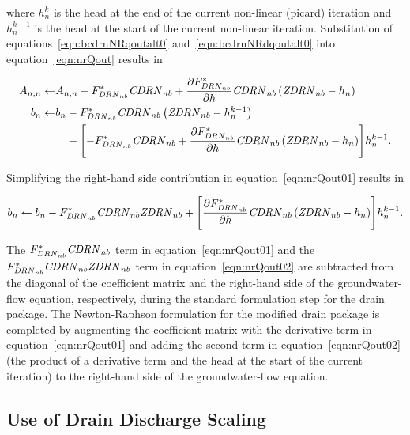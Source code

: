 \noindent where $h^k_n$ is the head at the end of the current non-linear (picard) iteration and $h^{k-1}_n$ is the head at the start of the current non-linear iteration. Substitution of equations~\ref{eqn:bcdrnNRqoutalt0} and~\ref{eqn:bcdrnNRdqoutalt0} into equation~\ref{eqn:nrQout} results in

\begin{equation}
	\label{eqn:nrQout01}
	\begin{aligned}
		A_{n,n} \leftarrow & A_{n,n} - F_{\mathit{DRN}_{nb}}^* \mathit{CDRN}_{nb}  + \frac{\partial F_{\mathit{DRN}_{nb}}^*}{\partial h} \mathit{CDRN}_{nb} \left( \mathit{ZDRN}_{nb} - h_{n} \right) \\
		b_n \leftarrow & b_n - F_{\mathit{DRN}_{nb}}^* \mathit{CDRN}_{nb} \left( \mathit{ZDRN}_{nb} - h_{n}^{k-1} \right) \\
		& \phantom{b_n} + \Biggl[ -F_{\mathit{DRN}_{nb}}^* \mathit{CDRN}_{nb} + \frac{\partial F_{\mathit{DRN}_{nb}}^*}{\partial h} \mathit{CDRN}_{nb} \left( \mathit{ZDRN}_{nb} - h_{n} \right) \Biggr] h^{k-1}_n .
	\end{aligned} 
\end{equation}

\noindent Simplifying the right-hand side contribution in equation~\ref{eqn:nrQout01} results in

\begin{equation}
	\label{eqn:nrQout02}
	b_n \leftarrow b_n - F_{\mathit{DRN}_{nb}}^* \mathit{CDRN}_{nb} \mathit{ZDRN}_{nb} + \Biggl[ \frac{\partial F_{\mathit{DRN}_{nb}}^*}{\partial h} \mathit{CDRN}_{nb} \left( \mathit{ZDRN}_{nb} - h_{n}  \right) \Biggr] h^{k-1}_n .
\end{equation}

\noindent The $F_{\mathit{DRN}_{nb}}^* \mathit{CDRN}_{nb}$ term in equation~\ref{eqn:nrQout01} and the $F_{\mathit{DRN}_{nb}}^* \mathit{CDRN}_{nb} \mathit{ZDRN}_{nb}$ term in equation~\ref{eqn:nrQout02} are subtracted from the diagonal of the coefficient matrix and the right-hand side of the groundwater-flow equation, respectively, during the standard formulation step for the drain package. The Newton-Raphson formulation for the modified drain package is completed by augmenting the coefficient matrix with the derivative term in equation~\ref{eqn:nrQout01} and adding the second term in equation~\ref{eqn:nrQout02} (the product of a derivative term and the head at the start of the current iteration) to the right-hand side of the groundwater-flow equation. 

\subsection{Use of Drain Discharge Scaling}

